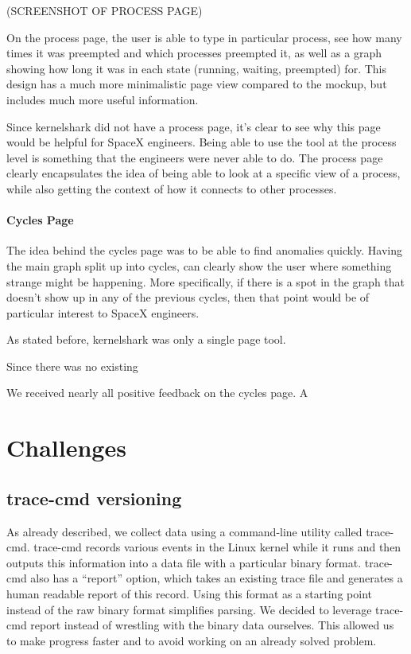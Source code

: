 \documentclass{hmcclinic}
\begin{document}
(SCREENSHOT OF PROCESS PAGE)

On the process page, the user is able to type in particular process, see how many times it was preempted and which processes preempted it, as well as a graph showing how long it was in each state (running, waiting, preempted) for. This design has a much more minimalistic page view compared to the mockup, but includes much more useful information.

Since kernelshark did not have a process page, it's clear to see why this page would be helpful for SpaceX engineers. Being able to use the tool at the process level is something that the engineers were never able to do. The process page clearly encapsulates the idea of being able to look at a specific view of a process, while also getting the context of how it connects to other processes.

\subsubsection{Cycles Page}
The idea behind the cycles page was to be able to find anomalies quickly. Having the main graph split up into cycles, can clearly show the user where something strange might be happening. More specifically, if there is a spot in the graph that doesn't show up in any of the previous cycles, then that point would be of particular interest to SpaceX engineers.

As stated before, kernelshark was only a single page tool. 

Since there was no existing 

We received nearly all positive feedback on the cycles page. A


\chapter{Challenges}
\section{trace-cmd versioning} %
  As already described, we collect data using a command-line utility called
  trace-cmd. trace-cmd records various events in the Linux kernel while it runs
  and then outputs this information into a data file with a particular binary
  format. trace-cmd also has a ``report'' option, which takes an existing trace
  file and generates a human readable report of this record. Using this format
  as a starting point instead of the raw binary format simplifies parsing.
  We decided to leverage trace-cmd report instead of wrestling with the binary
  data ourselves. This allowed us to make progress faster and to avoid working
  on an already solved problem.
\end{document}
